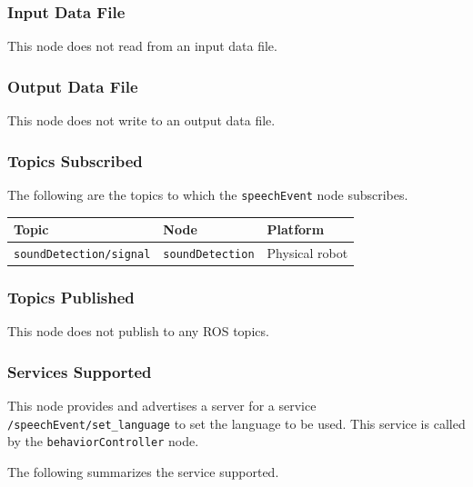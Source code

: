 \documentclass{CSSRforAfrica}
\begin{document}
{{\subsubsection*{Input Data File}
This node does not read from an input data file.


\subsubsection*{Output Data File}
This node does not write to an output data file.


\subsubsection*{Topics Subscribed}

The following are the topics to which the {\small \verb+speechEvent+} node subscribes.

\begin{center}
\begin{tabularx}{\linewidth}{| l | l | X|}
\hline 
{\small Topic }                               & {\small Node }                            &  {\small Platform}       \\
\hline
{\footnotesize \verb+soundDetection/signal+ }  & {\footnotesize \verb+soundDetection+}    & {\small Physical robot } \\ 
\hline
\end{tabularx}
\end{center}


\subsubsection*{Topics Published}

This node does not publish to any ROS topics.

\subsubsection*{Services Supported}

This node  provides and advertises a server for a service {\small \verb+/speechEvent/set_language+} to set the language to be used. This service is called by  the {\small \verb+behaviorController+} node.

The following summarizes the service supported.

}}
\end{document}
